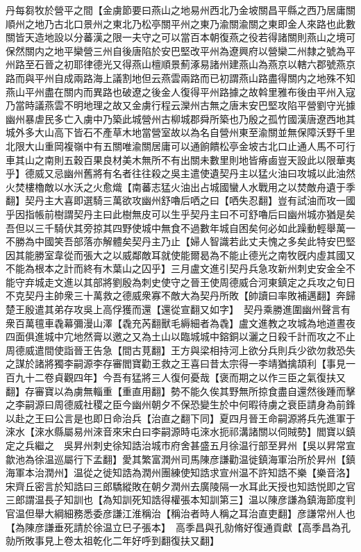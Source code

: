 丹每芻牧於營平之間【金虜節要曰燕山之地易州西北乃金坡關昌平縣之西乃居庸關順州之地乃古北口景州之東北乃松亭關平州之東乃渝關渝關之東即金人來路也此數關皆天造地設以分蕃漢之限一夫守之可以當百本朝復燕之役若得諸關則燕山之境可保然關内之地平欒營三州自後唐陷於安巴堅改平州為遼興府以營欒二州隸之號為平州路至石晉之初耶律德光又得燕山檀順景薊涿易諸州建燕山為燕京以轄六郡號燕京路而與平州自成兩路海上議割地但云燕雲兩路而已初謂燕山路盡得關内之地殊不知燕山平州盡在關内而異路也破遼之後金人復得平州路據之故斡里雅布後由平州入寇乃當時議燕雲不明地理之故又金虜行程云灤州古無之唐末安巴堅攻陷平營劉守光據幽州暴虐民多亡入虜中乃築此城營州古柳城郡舜所築也乃殷之孤竹國漢唐遼西地其城外多大山高下皆石不產草木地當營室故以為名自營州東至渝關並無保障沃野千里北限大山重岡複嶺中有五關唯渝關居庸可以通餉饋松亭金坡古北口止通人馬不可行車其山之南則五穀百果良材美木無所不有出關未數里則地皆瘠鹵豈天設此以限華夷乎】德威又忌幽州舊將有名者往往殺之吳主遣使遺契丹主以猛火油曰攻城以此油然火焚樓櫓敵以水沃之火愈熾【南蕃志猛火油出占城國蠻人水戰用之以焚敵舟遺于季翻】契丹主大喜即選騎三萬欲攻幽州舒嚕后哂之曰【哂失忍翻】豈有試油而攻一國乎因指帳前樹謂契丹主曰此樹無皮可以生乎契丹主曰不可舒嚕后曰幽州城亦猶是矣吾但以三千騎伏其旁掠其四野使城中無食不過數年城自困矣何必如此躁動輕舉萬一不勝為中國笑吾部落亦解體矣契丹主乃止【婦人智識若此丈夫愧之多矣此特安巴堅因其能勝室韋從而張大之以威鄰敵耳就使能爾曷為不能止德光之南牧旣内虛其國又不能為根本之計而終有木葉山之囚乎】三月盧文進引契丹兵急攻新州刺史安金全不能守弃城走文進以其部將劉殷為刺史使守之晉王使周德威合河東鎮定之兵攻之旬日不克契丹主帥衆三十萬救之德威衆寡不敵大為契丹所敗【帥讀曰率敗補邁翻】奔歸　楚王殷遣其弟存攻吳上高俘獲而還【還從宣翻又如字】　契丹乘勝進圍幽州聲言有衆百萬氊車毳幕彌漫山澤【毳充芮翻獸毛縟細者為毳】盧文進教之攻城為地道晝夜四面俱進城中宂地然膏以邀之又為土山以臨城城中鎔銅以灑之日殺千計而攻之不止周德威遣間使詣晉王告急【間古莧翻】王方與梁相持河上欲分兵則兵少欲勿救恐失之謀於諸將獨李嗣源李存審閻寶勸王救之王喜曰昔太宗得一李靖猶擒頡利【事見一百九十二卷貞觀四年】今吾有猛將三人復何憂哉【褒而期之以作三臣之氣復扶又翻】存審寶以為虜無輜重【重直用翻】勢不能久俟其野無所掠食盡自還然後踵而擊之李嗣源曰周德威社稷之臣今幽州朝夕不保恐變生於中何暇待虜之衰臣請身為前鋒以赴之王曰公言是也即日命治兵【治直之翻下同】夏四月晉王命嗣源將兵先進軍于淶水【淶水縣屬易州淶音來宋白曰李嗣源時屯淶水扼祁溝諸關以伺賊勢】閻寶以鎮定之兵繼之　吳昇州刺史徐知誥治城市府舍甚盛五月徐温行部至昇州【吳以昇常宣歙池為徐温巡屬行下孟翻】愛其繁富潤州司馬陳彦謙勸温徙鎮海軍治所於昇州【鎮海軍本治潤州】温從之徙知誥為潤州團練使知誥求宣州温不許知誥不樂【樂音洛】宋齊丘密言於知誥曰三郎驕縱敗在朝夕潤州去廣陵隔一水耳此天授也知誥悦即之官三郎謂温長子知訓也【為知訓死知誥得權張本知訓第三】温以陳彦謙為鎮海節度判官温但舉大綱細務悉委彦謙江淮稱治【稱治者時人稱之耳治直吏翻】彦謙常州人也【為陳彦謙垂死請於徐温立巳子張本】　高季昌與孔勍脩好復通貢獻【高季昌為孔勍所敗事見上卷太祖乾化二年好呼到翻復扶又翻】

